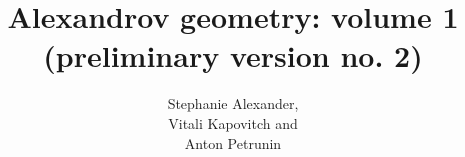 \frontmatter
\title{Alexandrov geometry: volume 1\\
{\large (preliminary version no. 2)}}
\date{}
\author{Stephanie Alexander,\\ Vitali Kapovitch and\\ Anton Petrunin}
\maketitle
